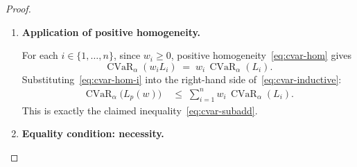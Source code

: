 \documentclass[12pt,openany]{book}
\newcommand{\bfw}{\mathbf{w}}
\DeclareMathOperator{\CVaR}{CVaR}
\numberwithin{equation}{chapter}
\theoremstyle{plain}
\theoremstyle{definition}
\theoremstyle{remark}
\def\bfw{w}%
\begin{document}
\begin{proof}
\begin{enumerate}[label=\textbf{Step \arabic*.}, leftmargin=*,
                  widest=Step 6., itemsep=1ex]
        We apply sub-additivity~\eqref{eq:cvar-subadd-two}
        inductively to the $n$-term sum
        $L_p(\bfw) = \sum_{i=1}^n w_i L_i$.
        For $n = 1$ the claim is trivial.
        Assume it holds for $n-1$ terms.  Then:
        \begin{align}
          \CVaR_\alpha\!\Bigl(\sum_{i=1}^n w_i L_i\Bigr)
          &= \CVaR_\alpha\!\Bigl(w_n L_n
             + \sum_{i=1}^{n-1} w_i L_i\Bigr)
          \notag \\
          &\leq \CVaR_\alpha(w_n L_n)
            + \CVaR_\alpha\!\Bigl(\sum_{i=1}^{n-1} w_i L_i\Bigr)
          \notag \\
          &\leq \CVaR_\alpha(w_n L_n)
            + \sum_{i=1}^{n-1} \CVaR_\alpha(w_i L_i)
          \notag \\
          &= \sum_{i=1}^n \CVaR_\alpha(w_i L_i),
          \label{eq:cvar-inductive}
        \end{align}
        where the first inequality uses~\eqref{eq:cvar-subadd-two}
        and the second uses the inductive hypothesis.

  \item \textbf{Application of positive homogeneity.}

        For each $i \in \{1,\ldots,n\}$, since $w_i \geq 0$,
        positive homogeneity~\eqref{eq:cvar-hom} gives
        \begin{equation}
          \CVaR_\alpha(w_i L_i)
          \;=\; w_i\,\CVaR_\alpha(L_i).
          \label{eq:cvar-hom-i}
        \end{equation}
        Substituting~\eqref{eq:cvar-hom-i} into the right-hand side
        of~\eqref{eq:cvar-inductive}:
        \begin{align}
          \CVaR_\alpha\!\bigl(L_p(\bfw)\bigr)
          &\;\leq\; \sum_{i=1}^n w_i\,\CVaR_\alpha(L_i).
          \label{eq:cvar-subadd-final}
        \end{align}
        This is exactly the claimed inequality~\eqref{eq:cvar-subadd}.

  \item \textbf{Equality condition: necessity.}


\end{enumerate}
\end{proof}
\end{document}
